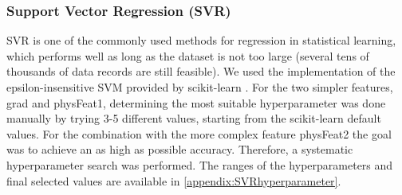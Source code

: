 \documentclass[11pt, authoryear]{elsarticle}
\begin{document}
	\subsubsection{Support Vector Regression (SVR)}
	\label{sec:SVRmodel}
	\Gls{SVR} \citep{Vapnik2000} is one of the commonly used methods for 
	regression in statistical learning, which performs well as long as the dataset
	is not too large (several tens of thousands of data records are still feasible). 
	We used the 
	implementation of the epsilon-insensitive SVM provided by scikit-learn 
	\citep{pedregosa2011scikit}. For the two simpler features, grad and physFeat1,
	determining the most suitable hyperparameter was done manually by trying 3-5
	different values, starting from the scikit-learn default values. For the 
	combination with the more complex feature physFeat2 the goal was to achieve
	an as high as possible accuracy. Therefore, a systematic hyperparameter search 
	was performed. The ranges of the hyperparameters and final selected values are 
	available in \cref{appendix:SVRhyperparameter}.
	
	
	
	
\end{document}
